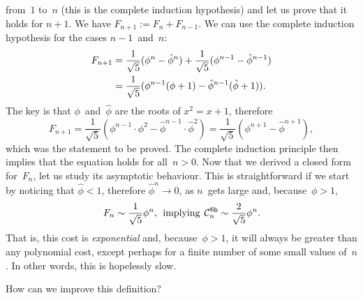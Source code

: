 from~\(1\) to~\(n\) (this is the complete induction hypothesis) and
let us prove that it holds for \(n+1\). We have \( F_{n+1} := F_n +
F_{n-1}\). We can use the complete induction hypothesis for the cases
\(n-1\)~and~\(n\):
\begin{align*}
\abovedisplayskip=4pt
\belowdisplayskip=0pt
F_{n+1} &= \frac{1}{\sqrt{5}}(\phi^n - \hat\phi^n) +
          \frac{1}{\sqrt{5}}(\phi^{n-1} - \hat\phi^{n-1})\\
       &= \frac{1}{\sqrt{5}}(\phi^{n-1}(\phi + 1) -
          \hat\phi^{n-1}(\hat\phi + 1)).
\end{align*}
The key is that \(\phi\)~and~\(\hat\phi\) are the roots of
\(x^2 = x + 1\), therefore
\begin{equation*}
  F_{n+1} = \frac{1}{\sqrt{5}}(\phi^{n-1} \cdot \phi^2 -
          \hat\phi^{n-1} \cdot \hat\phi^2)
       = \frac{1}{\sqrt{5}}(\phi^{n+1} - \hat\phi^{n+1}),
\end{equation*}
which was the statement to be proved. The complete induction principle
then implies that the equation holds for
all~\(n>0\).  Now that we derived a closed
form for~\(F_n\), let us study its asymptotic behaviour. This is
straightforward if we start by noticing that \(\hat\phi <
1\), therefore \(\hat\phi^n \rightarrow 0\), as \(n\)~gets large and,
because~\(\phi > 1\), 
\begin{equation*}
F_n \sim \frac{1}{\sqrt{5}}\phi^n,\,\; \text{implying}
\,\; \C{\fun{fib}}{n} \sim \frac{2}{\sqrt{5}}\phi^n.
\end{equation*}
That is, this cost is \emph{exponential} and, because~\(\phi > 1\), it will always be greater than
any polynomial cost, except perhaps for a finite number of some small
values of~\(n\). In other words, this is hopelessly slow.

How can we improve this definition?

